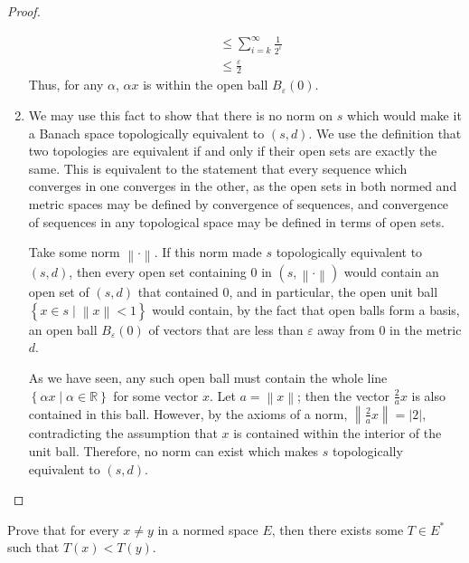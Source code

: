 \documentclass[12pt]{article}
\newcommand{\R}{\mathbb{R}}
\theoremstyle{definition}
\newenvironment{problem}[2][Problem]{\begin{trivlist}
\item[\hskip \labelsep {\bfseries #1}\hskip \labelsep {\bfseries #2.}]}{\end{trivlist}}
\begin{document}
\begin{proof}
\begin{enumerate}[label=(\roman*)]
\begin{align*}
	&\leq \sum_{i=k}^\infty \frac{1}{2^i}\\
	&\leq \frac{\varepsilon}{2}
\end{align*}
Thus, for any $\alpha$, $\alpha x$ is within the open ball $B_\varepsilon(0)$.
\item We may use this fact to show that there is no norm on $s$ which would make it a Banach space topologically equivalent to $(s,d)$. We use the definition that two topologies are equivalent if and only if their open sets are exactly the same. This is equivalent to the statement that every sequence which converges in one converges in the other, as the open sets in both normed and metric spaces may be defined by convergence of sequences, and convergence of sequences in any topological space may be defined in terms of open sets.
	\par Take some norm $\left \lVert { \cdot } \right \lVert $. If this norm made $s$ topologically equivalent to $(s,d)$, then every open set containing $0$ in $(s, \left \lVert { \cdot } \right \lVert )$ would contain an open set of $(s, d)$ that contained $0$, and in particular, the open unit ball $\left\{ x \in s \mid \left \lVert { x } \right \lVert < 1 \right\} $ would contain, by the fact that open balls form a basis, an open ball $B_\varepsilon(0)$ of vectors that are less than $\varepsilon$ away from $0$ in the metric $d$.
	\par As we have seen, any such open ball must contain the whole line $\left\{ \alpha x \mid \alpha \in \R \right\} $ for some vector $x$. Let $a = \left \lVert { x } \right \lVert $; then the vector $\frac{2}{a} x$ is also contained in this ball. However, by the axioms of a norm, $\left \lVert { \frac{2}{a} x } \right \lVert = \left \lvert { 2 } \right \lvert $, contradicting the assumption that $x$ is contained within the interior of the unit ball. Therefore, no norm can exist which makes $s$ topologically equivalent to $(s,d)$.
\end{enumerate}
\end{proof}
\begin{problem}{2}
	Prove that for every $x \neq y$ in a normed space $E$, then there exists some $T \in E^*$ such that $T(x) < T(y)$. 
\end{problem}
\end{document}
